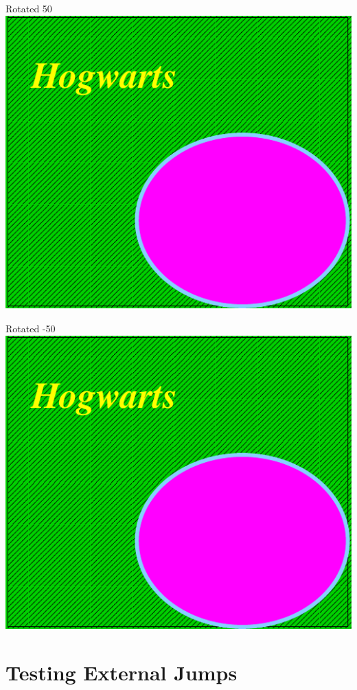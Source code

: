 \documentclass[]{article}
\begin{document}
Rotated 50 \includegraphics[scale=0.5,angle=50]{hog}

Rotated -50 \includegraphics[scale=0.5,angle=-50]{hog}


\section{Testing External Jumps}\label{ss:extjmps}
\end{document}
